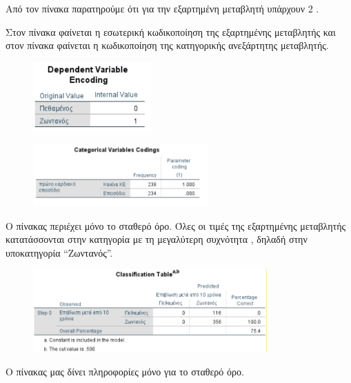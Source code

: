 \vspace{1.5cm}
Από τον πίνακα \textbf{} παρατηρούμε ότι για την εξαρτημένη μεταβλητή υπάρχουν 2 .

Στον πίνακα  φαίνεται η εσωτερική κωδικοποίηση της εξαρτημένης μεταβλητής και στον πίνακα  φαίνεται η κωδικοποίηση της κατηγορικής ανεξάρτητης μεταβλητής. 

\clearpage

\begin{figure}[h]
    \centering
    \includegraphics[width=0.4\textwidth]{images/502.PNG}
\end{figure}

\vspace{0.5cm}
\begin{figure}[h]
    \centering
    \includegraphics[width=0.6\textwidth]{images/503.PNG}
\end{figure}

Ο πίνακας  περιέχει μόνο το σταθερό όρο. Όλες οι τιμές της εξαρτημένης μεταβλητής κατατάσσονται στην κατηγορία με τη μεγαλύτερη συχνότητα , δηλαδή στην υποκατηγορία “Ζωντανός”.

\begin{figure}[h]
    \centering
    \includegraphics[width=0.8\textwidth]{images/504.PNG}
\end{figure}

\vspace{1cm}
Ο πίνακας \textbf{} μας δίνει πληροφορίες μόνο για το σταθερό όρο. 

